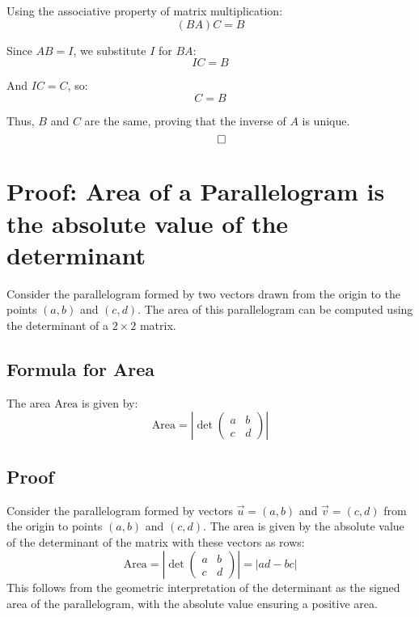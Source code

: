 \documentclass{article}
\begin{document}
Using the associative property of matrix multiplication:
\[
(BA)C = B
\]

Since \( AB = I \), we substitute \( I \) for \( BA \):
\[
IC = B
\]

And \( IC = C \), so:
\[
C = B
\]

Thus, \( B \) and \( C \) are the same, proving that the inverse of \( A \) is unique.
\[
\qed
\]


\section{Proof: Area of a Parallelogram is the absolute value of the determinant}
Consider the parallelogram formed by two vectors drawn from the origin to the points \( (a, b) \) and \( (c, d) \). The area of this parallelogram can be computed using the determinant of a \( 2 \times 2 \) matrix.

\subsection*{Formula for Area}
The area \( \text{Area} \) is given by:
\[
\text{Area} = \left| \det \begin{pmatrix} a & b \\ c & d \end{pmatrix} \right|
\]

\subsection*{Proof}
Consider the parallelogram formed by vectors \(\vec{u} = (a, b)\) and \(\vec{v} = (c, d)\) from the origin to points \((a, b)\) and \((c, d)\). The area is given by the absolute value of the determinant of the matrix with these vectors as rows:
\[
\text{Area} = \left| \det \begin{pmatrix} a & b \\ c & d \end{pmatrix} \right| = |ad - bc|
\]
This follows from the geometric interpretation of the determinant as the signed area of the parallelogram, with the absolute value ensuring a positive area.
\end{document}
